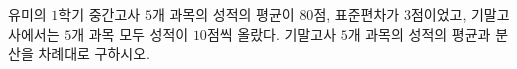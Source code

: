 유미의 $1$학기 중간고사 $5$개 과목의 성적의 평균이 $80$점, 표준편차가 $3$점이었고, 기말고사에서는 $5$개 과목 모두 성적이 $10$점씩 올랐다. 기말고사 $5$개 과목의 성적의 평균과 분산을 차례대로 구하시오. 
